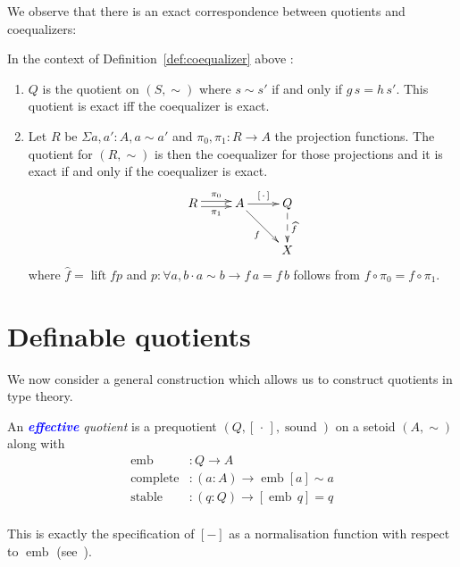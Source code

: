 \documentclass[envcountsame]{llncs}
\newcommand{\amend}[2][]{\textcolor{blue}{#2}}
\newcommand{\definable}{\amend[]{\textbf{effective }}}
\newcommand{\dotph}{\,\cdot\,} %
\providecommand{\class}[1]{[#1]}
\providecommand{\dlift}[1]{\widehat{#1}}
\DeclareMathOperator{\sound}{sound}
\DeclareMathOperator{\emb}{emb}
\DeclareMathOperator{\complete}{complete}
\DeclareMathOperator{\stable}{stable}
\DeclareMathOperator{\lift}{lift}
\renewcommand{\equiv}{=}
\begin{document}
We observe that there is an exact correspondence between quotients and coequalizers:
\begin{proposition} In the context of Definition~\ref{def:coequalizer} above :
\begin{enumerate}
\item $Q$ is the quotient on $(S,\sim)$ where $s\sim s'$ if and only if $g\,s=h\,s'$.
This quotient is exact if{f} the coequalizer is exact.
\item Let $R$ be $\Sigma a,a':A,a\sim a'$ and $\pi_0,\pi_1 : R\to A$ the projection functions. The quotient for $(R,\sim)$ is then the coequalizer for those projections and it is exact if and only if the coequalizer is exact.
\[\xymatrix{
R\ar@<0.5ex>[r]^{\pi_0}\ar@<-0.5ex>[r]_{\pi_1}& A\ar[r]^{\class\dotph}\ar[dr]_{f} & Q\ar@{-->}[d]^{\dlift f}\\
&&X
}\]
where $\dlift f=\lift f p$ and $p \colon \forall a,b\cdot a\sim b \to f\,a \equiv f\,b$ follows from $f \circ \pi_0 = f \circ \pi_1$.
\end{enumerate}
\end{proposition}

\section{Definable quotients}\label{sec:defquotients}

We now consider a general construction which allows us to construct quotients in type theory.

\begin{definition}\label{def:defquotients}
An \emph{\definable quotient} is a prequotient $(Q, \class{\dotph}, \sound)$ on a setoid $(A,\sim)$ along with
\begin{align*}
\emb &: Q \to A\\
\complete &: (a : A) \to \emb {\class a} \sim a\\
\stable &: (q:Q) \to \class{\emb\,q} \equiv q\\
\end{align*}
\end{definition}

This is exactly the specification of  $\class{-}$ as a
normalisation function with respect to $\emb$ (see~\cite{txa:jtait}).
\end{document}
